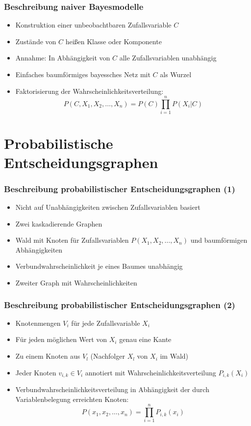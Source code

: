 \documentclass{beamer}
\begin{document}
\begin{frame}
  \frametitle{Beschreibung naiver Bayesmodelle}
  \begin{itemize}
    \item Konstruktion einer unbeobachtbaren Zufallsvariable $C$
    \item Zustände von $C$ heißen Klasse oder Komponente
    \item Annahme: In Abhängigkeit von $C$ alle Zufallsvariablen unabhängig
    \item Einfaches baumförmiges bayessches Netz mit $C$ als Wurzel
    \item Faktorisierung der Wahrscheinlichkeitsverteilung: 
\[ P(C,X_1,X_2,\dots,X_n) = P(C) \prod_{i=1}^n P(X_i|C) \]
  \end{itemize}
\end{frame}




\section{Probabilistische Entscheidungsgraphen}
\frame{\tableofcontents[currentsection]}

\begin{frame}
  \frametitle{Beschreibung probabilistischer Entscheidungsgraphen (1)}
  \begin{itemize}
    \item Nicht auf Unabhängigkeiten zwischen Zufallsvariablen basiert
    \item Zwei kaskadierende Graphen
    \item Wald mit Knoten für Zufallsvariablen $P(X_1,X_2,\dots,X_n)$ und baumförmigen Abhängigkeiten
    \item Verbundwahrscheinlichkeit je eines Baumes unabhängig
    \item Zweiter Graph mit Wahrscheinlichkeiten
  \end{itemize}
\end{frame}

\begin{frame}
  \frametitle{Beschreibung probabilistischer Entscheidungsgraphen (2)}
  \begin{itemize}
    \item Knotenmengen $V_i$ für jede Zufallsvariable $X_i$
    \item Für jeden möglichen Wert von $X_i$ genau eine Kante
    \item Zu einem Knoten aus $V_l$ (Nachfolger $X_l$ von $X_i$ im Wald)
    \item Jeder Knoten $v_{i,k} \in V_i$ annotiert mit Wahrscheinlichkeitsverteilung $P_{i,k}(X_i)$
    \item Verbundwahrscheinlichkeitsverteilung in Abhängigkeit der durch Variablenbelegung erreichten Knoten: 
\[P(x_1,x_2,\dots,x_n) = \prod_{i=1}^n P_{i,k}(x_i) \]
  \end{itemize}
\end{frame}
\end{document}
